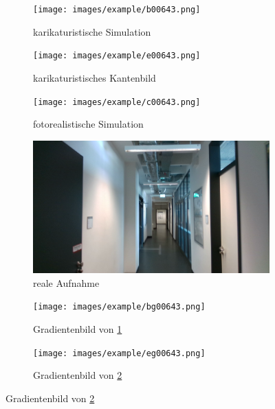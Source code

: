 \vspace{\fill}
\begin{figure}[htp]
	\centering
	\begin{subfigure}[t]{0.24\linewidth}
		\centering
		\texttt{[image: images/example/b00643.png]}
		\caption{karikaturistische Simulation}
		\label{subfig:cartoonish}
	\end{subfigure}
	\hfill
	\begin{subfigure}[t]{0.24\linewidth}
		\centering
		\texttt{[image: images/example/e00643.png]}
		\caption{karikaturistisches Kantenbild}
		\label{subfig:edge}
	\end{subfigure}
	\hfill
	\begin{subfigure}[t]{0.24\linewidth}
		\centering
		\texttt{[image: images/example/c00643.png]}
		\caption{fotorealistische \hspace{1cm} Simulation}
		\label{subfig:photorealistic}
	\end{subfigure}
	\hfill 
	\begin{subfigure}[t]{0.24\linewidth}
		\centering
		\includegraphics[width=\linewidth]{images/example/r000305.png}
		\caption{reale Aufnahme}
		\label{subfig:real}
	\end{subfigure}
	\hfill 
	\begin{subfigure}[t]{0.24\linewidth}
		\centering
		\texttt{[image: images/example/bg00643.png]}
		\caption{Gradientenbild  \hspace{1cm} von \ref{subfig:cartoonish}}
	\end{subfigure}
	\hfill
	\begin{subfigure}[t]{0.24\linewidth}
		\centering
		\texttt{[image: images/example/eg00643.png]}
		\caption{Gradientenbild  \hspace{1cm} von \ref{subfig:edge}}
	\end{subfigure}
	\hfill

\end{figure}
